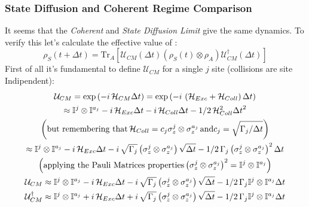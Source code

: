 \documentclass[a4paper,12pt]{article}
\begin{document}
	\subsubsection{State Diffusion and Coherent Regime Comparison}
	\label{sub:State Diffusion_and_Coherent_Regime_Comparison}
	It seems that the \textit{Coherent} and \textit{State Diffusion Limit} give the same dynamics. To verify this let's calculate the effective value of :
	\begin{equation}
		\rho_{S}(t + \Delta t) = \text{Tr}_A \left[ \mathcal{U}_{CM}(\Delta t) \left(\rho_{S}(t) \otimes \rho_{A}\right) \mathcal{U}_{CM}^{\dagger}(\Delta t) \right]
		\label{eq:dynamical_map_rho_s}
	\end{equation}
	First of all it's fundamental to define $ \mathcal{U}_{CM} $ for a single $ j $ site (collisions are site Indipendent):
	\begin{gather}
		\mathcal{U}_{CM} = \exp{\left(-i \, \mathcal{H}_{CM} \Delta t \right)} = \exp{\left(-i \, \left(\mathcal{H}_{Exc} + \mathcal{H}_{Coll}\right) \Delta t \right)} \notag \\
		\approx \mathbb{I}^{j} \otimes \mathbb{I}^{a_j} -i \, \mathcal{H}_{Exc} \Delta t -i \, \mathcal{H}_{Coll} \Delta t - 1/2 \, \mathcal{H}_{Coll}^{2} {\Delta t}^{2} \notag \\
		\left(\text{but remembering that} \, \mathcal{H}_{Coll} = c_j \sigma_{z}^{j} \otimes \sigma_{z}^{a_j} \, \text{and} c_j = \sqrt{\Gamma_{j}/\Delta t}\right) \notag \\
		\approx \mathbb{I}^{j} \otimes \mathbb{I}^{a_j} -i \, \mathcal{H}_{Exc} \Delta t -i \,\sqrt{\Gamma_{j}} \left(\sigma_{z}^{j} \otimes \sigma_{z}^{a_j} \right) \sqrt{\Delta t} - 1/2 \, \Gamma_{j} \left(\sigma_{z}^{j} \otimes \sigma_{z}^{a_j} \right)^{2} \Delta t \notag \\
		\left( \text{applying the Pauli Matrices properties} \left(\sigma_{z}^{j} \otimes \sigma_{z}^{a_j} \right)^{2} = \mathbb{I}^{j} \otimes \mathbb{I}^{a_j} \right) \notag \\
		\mathcal{U}_{CM} \approx \mathbb{I}^{j} \otimes \mathbb{I}^{a_j} -i \, \mathcal{H}_{Exc} \Delta t -i \,\sqrt{\Gamma_{j}} \left(\sigma_{z}^{j} \otimes \sigma_{z}^{a_j} \right) \sqrt{\Delta t} - 1/2 \, \Gamma_{j}\mathbb{I}^{j} \otimes \mathbb{I}^{a_j} \Delta t \label{eq:U_CM_expansion_series} \\
		\mathcal{U}_{CM}^{\dagger} \approx \mathbb{I}^{j} \otimes \mathbb{I}^{a_j} +i \, \mathcal{H}_{Exc} \Delta t +i \,\sqrt{\Gamma_{j}} \left(\sigma_{z}^{j} \otimes \sigma_{z}^{a_j} \right) \sqrt{\Delta t} - 1/2 \, \Gamma_{j} \mathbb{I}^{j} \otimes \mathbb{I}^{a_j} \Delta t \label{eq:U_CM_dagger_expansion_series}
	\end{gather}
\end{document}
